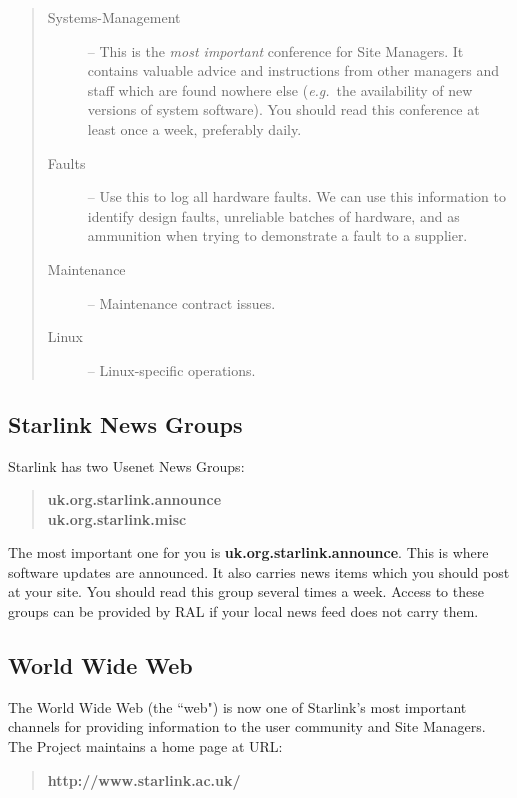 \documentclass[twoside,11pt]{article}
\newcommand{\htmladdnormallink}[2]{#1}
\begin{document}
\begin{quote}
\begin{description}
\item [Systems-Management] --
 This is the {\em most important} conference for Site Managers.
 It contains valuable advice and instructions from other managers and
 staff which are found nowhere else ({\em e.g.}\ the availability of new
 versions of system software).
 You should read this conference at least once a week, preferably daily.
\item [Faults] --
 Use this to log all hardware faults.
 We can use this information to identify design faults, unreliable batches of
 hardware, and as ammunition when trying to demonstrate a fault to a supplier.
\item [Maintenance] --
 Maintenance contract issues.
\item [Linux] --
 Linux-specific operations.
\end{description}
\end{quote}

\subsection{Starlink News Groups}

Starlink has two Usenet News Groups:

\begin{quote}
{\bf uk.org.starlink.announce\\
     uk.org.starlink.misc}
\end{quote}

The most important one for you is {\bf uk.org.starlink.announce}.
This is where software updates are announced.
It also carries news items which you should post at your site.
You should read this group several times a week.
Access to these groups can be provided by RAL if your local news feed
does not carry them.

\subsection{\label{web}World Wide Web}

The World Wide Web (the ``web") is now one of Starlink's most important
channels for providing information to the user community and Site Managers.
The Project maintains a home page at URL:

\begin{quote}
\htmladdnormallink{{\bf http://www.starlink.ac.uk/}}{http://www.starlink.ac.uk/}
\end{quote}
\end{document}
